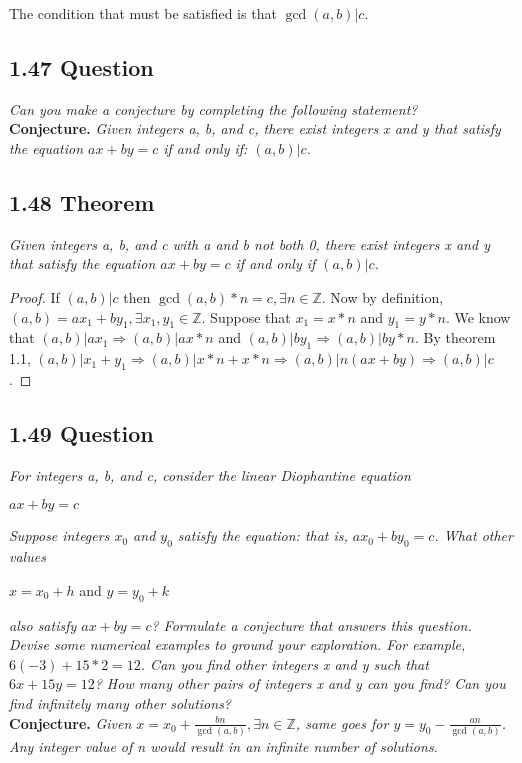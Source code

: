 \documentclass{article}
\begin{document}
The condition that must be satisfied is that $\gcd (a,b) \vert c$. 

\subsection*{1.47 Question} 
\quad \textit{Can you make a conjecture by completing the following statement?}\\
\textbf{Conjecture.} 
\textit{Given integers a, b, and c, there exist integers x and y that satisfy the equation $ax+by=c$ if and only if: $(a,b) \vert c$.}

\subsection*{1.48 Theorem} 
\quad \textit{Given integers a, b, and c with a and b not both 0, there exist integers x and y that satisfy the equation $ax+by=c$ if and only if $(a,b) \vert c$.}

\begin{proof}
If $(a,b) \vert c$ then $\gcd(a,b) * n = c, \exists n \in \mathbb{Z}$. Now by definition, $(a,b) = ax_1 + by_1, \exists x_{1},y_{1} \in \mathbb{Z}$. Suppose that $x_1 = x*n$ and $y_1 = y*n$. We know that $(a,b) \vert ax_1 \Longrightarrow (a,b) \vert ax*n$ and $(a,b) \vert by_1 \Longrightarrow (a,b) \vert by*n$. By theorem 1.1, $(a,b) \vert x_1 + y_1 \Longrightarrow (a,b) \vert x*n+x*n \Longrightarrow (a,b) \vert n(ax+by) \Longrightarrow (a,b) \vert c$.
\end{proof}

\subsection*{1.49 Question} 
\quad \textit{For integers a, b, and c, consider the linear Diophantine equation}
\begin{center}
    $ax+by = c$
\end{center}
\textit{Suppose integers $x_0$ and $y_0$ satisfy the equation: that is, $ax_0 + by_0 = c$. What other values}
\begin{center}
    $x = x_0 + h$ and $y = y_0 + k$
\end{center}

\textit{also satisfy $ax+by=c$? Formulate a conjecture that answers this question. Devise some numerical examples to ground your exploration. For example, $6(-3) + 15 * 2 = 12$. Can you find other integers x and y such that $6x+15y=12$? How many other pairs of integers x and y can you find? Can you find infinitely many other solutions?}\\
\textbf{Conjecture.} 
\textit{Given $x = x_0 + \frac{bn}{\gcd(a,b)}, \exists n \in \mathbb{Z}$, same goes for $y = y_0 - \frac{an}{\gcd(a,b)}$. Any integer value of n would result in an infinite number of solutions.}
\end{document}
